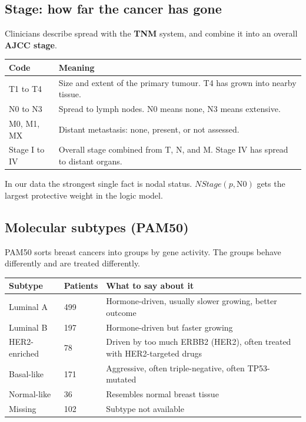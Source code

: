 \documentclass[11pt,a4paper]{article}
\newcommand{\pred}[1]{\mathit{#1}}
\newcommand{\term}[1]{\textbf{#1}}
\begin{document}
\subsection{Stage: how far the cancer has gone}
Clinicians describe spread with the \term{TNM} system, and combine it into an overall \term{AJCC stage}.
\begin{center}
\begin{tabular}{lp{11cm}}
\toprule
Code & Meaning \\
\midrule
T1 to T4 & Size and extent of the primary tumour. T4 has grown into nearby tissue. \\
N0 to N3 & Spread to lymph nodes. N0 means none, N3 means extensive. \\
M0, M1, MX & Distant metastasis: none, present, or not assessed. \\
Stage I to IV & Overall stage combined from T, N, and M. Stage IV has spread to distant organs. \\
\bottomrule
\end{tabular}
\end{center}
In our data the strongest single fact is nodal status. $\pred{NStage}(p,\mathrm{N0})$ gets the largest protective weight in the logic model.

\subsection{Molecular subtypes (PAM50)}
PAM50 sorts breast cancers into groups by gene activity. The groups behave differently and are treated differently.
\begin{center}
\begin{tabular}{llp{9.4cm}}
\toprule
Subtype & Patients & What to say about it \\
\midrule
Luminal A & 499 & Hormone-driven, usually slower growing, better outcome \\
Luminal B & 197 & Hormone-driven but faster growing \\
HER2-enriched & 78 & Driven by too much ERBB2 (HER2), often treated with HER2-targeted drugs \\
Basal-like & 171 & Aggressive, often triple-negative, often TP53-mutated \\
Normal-like & 36 & Resembles normal breast tissue \\
Missing & 102 & Subtype not available \\
\bottomrule
\end{tabular}
\end{center}
\end{document}

